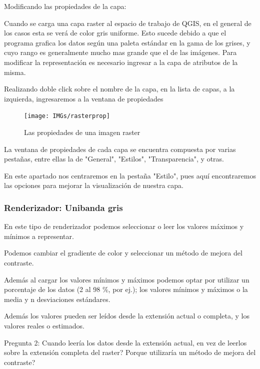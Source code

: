 \documentclass[onecolumn]{article}
\begin{document}
Modificando las propiedades de la capa:

Cuando se carga una capa raster al espacio de trabajo de QGIS, en el general de los casos esta se verá de color gris uniforme. 
Esto sucede debido a que el programa grafica los datos según una paleta estándar en la gama de los grises, y cuyo rango es generalmente mucho mas grande que el de las imágenes. 
Para modificar la representación es necesario ingresar a la capa de atributos de la misma. 

Realizando doble click sobre el nombre de la capa, en la lista de capas, a la izquierda, ingresaremos a la ventana de propiedades

\begin{figure}
	\centering
	\texttt{[image: IMGs/rasterprop]}
	\caption{Las propiedades de una imagen raster}
	\label{fig:interfaz}
\end{figure}

La ventana de propiedades de cada capa se encuentra compuesta por varias pestañas, entre ellas la de "General", "Estilos", "Transparencia", y otras.

En este apartado nos centraremos en la pestaña "Estilo", pues aquí encontraremos  las opciones para mejorar la visualización de nuestra capa.

\subsubsection{Renderizador: Unibanda gris}

En este tipo de renderizador podemos seleccionar o leer los valores máximos y mínimos a representar.

Podemos cambiar el gradiente de color y seleccionar un método de mejora del contraste. 

Además al cargar los valores mínimos y máximos podemos optar por utilizar un porcentaje de los datos (2 al 98 \%, por ej.); los valores mínimos y máximos o la media y n desviaciones estándares.

Además los valores pueden ser leídos desde la extensión actual o completa, y los valores reales o estimados.

\begin{mdframed}[]
	Pregunta 2: Cuando leería los datos desde la extensión actual, en vez de leerlos sobre la extensión completa del raster? Porque utilizaría un método de mejora del contraste?
\end{mdframed}
\end{document}

